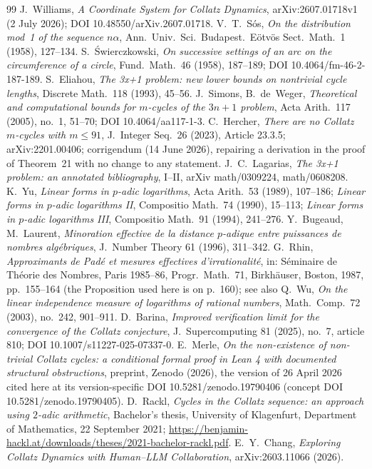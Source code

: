 \documentclass[11pt]{article}
\theoremstyle{remark}
\begin{document}
\begin{thebibliography}{99}
 J.~Williams, \emph{A Coordinate System for Collatz Dynamics}, arXiv:2607.01718v1 (2 July 2026); DOI 10.48550/arXiv.2607.01718.
 V.~T.~S\'os, \emph{On the distribution mod~1 of the sequence $n\alpha$}, Ann.\ Univ.\ Sci.\ Budapest.\ E\"otv\"os Sect.\ Math.\ 1 (1958), 127--134.
 S.~\'Swierczkowski, \emph{On successive settings of an arc on the circumference of a circle}, Fund.\ Math.\ 46 (1958), 187--189; DOI 10.4064/fm-46-2-187-189.
 S.~Eliahou, \emph{The 3x+1 problem: new lower bounds on nontrivial cycle lengths}, Discrete Math.\ 118 (1993), 45--56.
 J.~Simons, B.~de~Weger, \emph{Theoretical and computational bounds for $m$-cycles of the $3n+1$ problem}, Acta Arith.\ 117 (2005), no.~1, 51--70; DOI 10.4064/aa117-1-3.
 C.~Hercher, \emph{There are no Collatz $m$-cycles with $m \le 91$}, J.\ Integer Seq.\ 26 (2023), Article 23.3.5; arXiv:2201.00406; corrigendum (14 June 2026), repairing a derivation in the proof of Theorem~21 with no change to any statement.
 J.~C.~Lagarias, \emph{The 3x+1 problem: an annotated bibliography}, I--II, arXiv math/0309224, math/0608208.
 K.~Yu, \emph{Linear forms in $p$-adic logarithms}, Acta Arith.\ 53 (1989), 107--186; \emph{Linear forms in $p$-adic logarithms II}, Compositio Math.\ 74 (1990), 15--113; \emph{Linear forms in $p$-adic logarithms III}, Compositio Math.\ 91 (1994), 241--276.
 Y.~Bugeaud, M.~Laurent, \emph{Minoration effective de la distance $p$-adique entre puissances de nombres alg\'ebriques}, J.\ Number Theory 61 (1996), 311--342.
 G.~Rhin, \emph{Approximants de Pad\'e et mesures effectives d'irrationalit\'e}, in: S\'eminaire de Th\'eorie des Nombres, Paris 1985--86, Progr.\ Math.\ 71, Birkh\"auser, Boston, 1987, pp.\ 155--164 (the Proposition used here is on p.~160); see also Q.~Wu, \emph{On the linear independence measure of logarithms of rational numbers}, Math.\ Comp.\ 72 (2003), no.\ 242, 901--911.
 D.~Barina, \emph{Improved verification limit for the convergence of the Collatz conjecture}, J.\ Supercomputing 81 (2025), no.~7, article 810; DOI 10.1007/s11227-025-07337-0.
 E.~Merle, \emph{On the non-existence of non-trivial Collatz cycles: a conditional formal proof in Lean 4 with documented structural obstructions}, preprint, Zenodo (2026), the version of 26 April 2026 cited here at its version-specific DOI 10.5281/zenodo.19790406 (concept DOI 10.5281/zenodo.19790405).
 D.~Rackl, \emph{Cycles in the Collatz sequence: an approach using $2$-adic arithmetic}, Bachelor's thesis, University of Klagenfurt, Department of Mathematics, 22 September 2021; \url{https://benjamin-hackl.at/downloads/theses/2021-bachelor-rackl.pdf}.
 E.~Y.~Chang, \emph{Exploring Collatz Dynamics with Human--LLM Collaboration}, arXiv:2603.11066 (2026).
\end{thebibliography}
\end{document}
